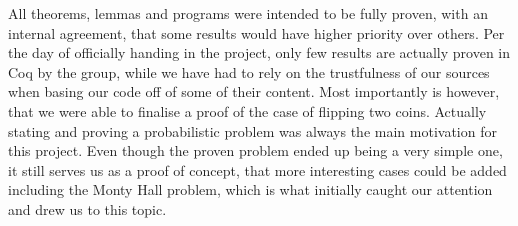 All theorems, lemmas and programs were intended to be fully proven, with an internal agreement, that some results would have higher priority over others. Per the day of officially handing in the project, only few results are actually proven in Coq by the group, while we have had to rely on the trustfulness of our sources when basing our code off of some of their content. Most importantly is however, that we were able to finalise a proof of the case of flipping two coins. Actually stating and proving a probabilistic problem was always the main motivation for this project. Even though the proven problem ended up being a very simple one, it still serves us as a proof of concept, that more interesting cases could be added including the Monty Hall problem, which is what initially caught our attention and drew us to this topic. 


